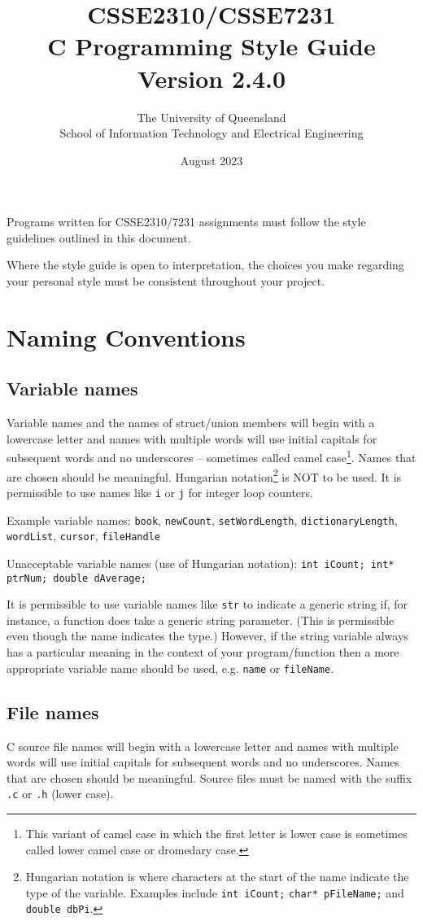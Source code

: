 \documentclass{article}
\title{CSSE2310/CSSE7231\\C Programming Style Guide\\Version 2.4.0}
\author{The University of Queensland\\School of Information Technology and Electrical Engineering}
\date{August 2023}
\begin{document}
\maketitle
\thispagestyle{plain}
\linenumbers

Programs written for CSSE2310/7231 assignments must follow the style guidelines outlined in this document.

Where the style guide is open to interpretation, the choices you make regarding your personal style 
must be consistent throughout your project.

\section{Naming Conventions}
\subsection{Variable names}
\label{sec:naming-variable}
Variable names and the names of struct/union members will begin with a lowercase letter and names with multiple words 
will use initial capitals for subsequent words and no underscores -- sometimes called camel case\footnote{This variant of camel case 
in which the first letter is lower case is sometimes called lower camel case or dromedary case.}. 
Names that are chosen should be meaningful. Hungarian notation\footnote{Hungarian notation is where characters at the start of 
the name indicate the type of the variable. Examples include \texttt{int iCount;} \texttt{char* pFileName;} and
\texttt{double dbPi}.}
 is NOT to be used.
It is permissible to use names like \texttt{i} or \texttt{j} for integer loop counters.

Example variable names: \texttt{book}, \texttt{newCount}, \texttt{setWordLength}, \texttt{dictionaryLength}, 
\texttt{wordList}, \texttt{cursor}, \texttt{fileHandle}

Unacceptable variable names (use of Hungarian notation): \texttt{int iCount; int* ptrNum; double dAverage;}

It is permissible to use variable names like \texttt{str} to indicate a generic string if, for instance, a function does take a generic
string parameter. (This is permissible even though the name indicates the type.) However, if the string variable always has a particular meaning in the context of your program/function then a more appropriate variable name should
be used, e.g. \texttt{name} or \texttt{fileName}.
\subsection{File names}
\label{sec:naming-files}
C source file names will begin with a lowercase letter and names with multiple words 
will use initial capitals for subsequent words and no underscores. 
Names that are chosen should be meaningful. Source files must be named with the suffix \texttt{.c} or \texttt{.h} (lower case).
\end{document}
